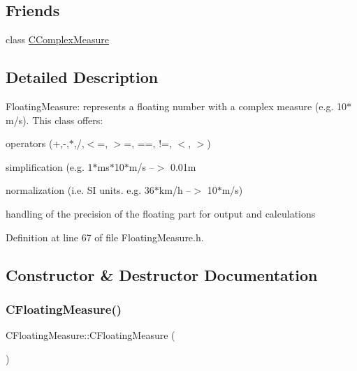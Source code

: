 \subsection*{Friends}
\begin{DoxyCompactItemize}
\item 
class \hyperlink{classCFloatingMeasure_a2af9f0d4f7a8de5099b8d23df211b616}{C\+Complex\+Measure}
\end{DoxyCompactItemize}


\subsection{Detailed Description}
Floating\+Measure\+: represents a floating number with a complex measure (e.\+g. 10$\ast$m/s). This class offers\+: 


\begin{DoxyItemize}
\item operators (+,-\/,$\ast$,/,$<$=, $>$=, ==, !=, $<$, $>$)
\item simplification (e.\+g. 1$\ast$ms$\ast$10$\ast$m/s --$>$ 0.\+01m
\item normalization (i.\+e. SI units. e.\+g. 36$\ast$km/h --$>$ 10$\ast$m/s)
\item handling of the precision of the floating part for output and calculations 
\end{DoxyItemize}

Definition at line 67 of file Floating\+Measure.\+h.



\subsection{Constructor \& Destructor Documentation}
\mbox{\label{classCFloatingMeasure_aa30b4d0ea6b6bbc022717c875419fb44}} 
\subsubsection{\texorpdfstring{C\+Floating\+Measure()}{CFloatingMeasure()}\hspace{0.1cm}{\footnotesize\ttfamily [1/3]}}
{\footnotesize\ttfamily C\+Floating\+Measure\+::\+C\+Floating\+Measure (\begin{DoxyParamCaption}{ }\end{DoxyParamCaption})}

